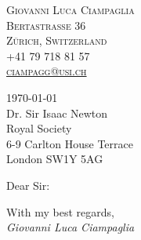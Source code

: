 \documentclass[11pt, a4paper]{article}
\begin{document}
\center
\textsc{Giovanni Luca Ciampaglia\\
Bertastraße 36\\
 Zürich, Switzerland\\
+41 79 718 81 57\\
\href{mailto:ciampagg@usi.ch}{ciampagg@usi.ch}
}

\raggedright
\vspace{0.5in}
\today\\[2em]

Dr. Sir Isaac Newton\\
Royal Society\\
6-9 Carlton House Terrace\\
London SW1Y 5AG\\
\vspace{2em}

Dear Sir:

\lipsum[1-2]

\vspace{1in}
\raggedleft
With my best regards,\\
\emph{Giovanni Luca Ciampaglia}

\vspace{1in}
\end{document}
